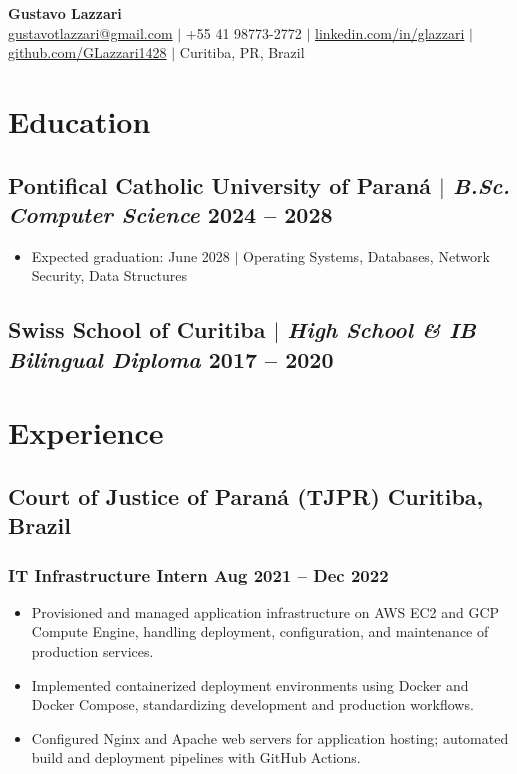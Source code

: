 \documentclass[10pt]{article}
\begin{document}
\begin{center}
	{\LARGE\bfseries Gustavo Lazzari} \\
	\vspace{2pt}
	\href{mailto:gustavotlazzari@gmail.com}{gustavotlazzari@gmail.com} $|$
	+55 41 98773-2772 $|$
	\href{https://www.linkedin.com/in/glazzari}{linkedin.com/in/glazzari} $|$
	\href{https://github.com/GLazzari1428}{github.com/GLazzari1428} $|$
	Curitiba, PR, Brazil
\end{center}

\section{Education}
\subsection{Pontifical Catholic University of Paran\'{a} $|$ {\normalfont\itshape B.Sc. Computer Science} \hfill 2024 -- 2028}
\begin{itemize}
	\item Expected graduation: June 2028 $|$ Operating Systems, Databases, Network Security, Data Structures
\end{itemize}
\subsection{Swiss School of Curitiba $|$ {\normalfont\itshape High School \& IB Bilingual Diploma} \hfill 2017 -- 2020}

\section{Experience}
\subsection{Court of Justice of Paran\'{a} (TJPR) \hfill Curitiba, Brazil}
\subsubsection{IT Infrastructure Intern \hfill Aug 2021 -- Dec 2022}
\begin{itemize}
	\item Provisioned and managed application infrastructure on AWS EC2 and GCP Compute Engine, handling deployment, configuration, and maintenance of production services.
	\item Implemented containerized deployment environments using Docker and Docker Compose, standardizing development and production workflows.
	\item Configured Nginx and Apache web servers for application hosting; automated build and deployment pipelines with GitHub Actions.
\end{itemize}
\end{document}
